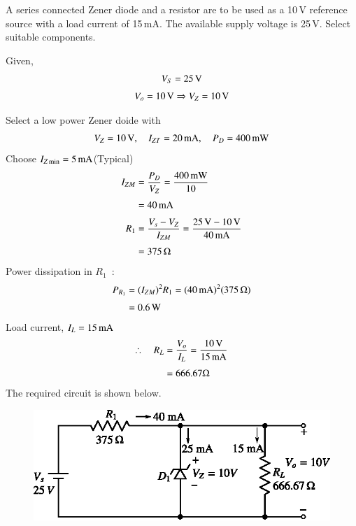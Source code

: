 \begin{example}\label{exam2.29}
A series connected Zener diode and a resistor are to be used as a 10\,V reference source with a load current of 15\,mA. The available supply voltage is 25\,V. Select suitable components.
\end{example}

\begin{solution}
Given,
\begin{gather*}
V_{S} = 25\,\text{V}\\[3pt]
V_{o}=10\text{\,V}\Rightarrow V_{Z}=10\text{\,V}
\end{gather*}

Select a low power Zener doide with
$$
V_{Z}=10\text{\,V},\quad I_{ZT}=20\text{\,mA},\quad P_{D}=400\text{\,mW}
$$
Choose $I_{Z\min}=5\text{\,mA}$\quad (Typical)
\begin{align*}
I_{ZM} &= \frac{P_{D}}{V_{Z}}=\frac{400\text{\,mW}}{10}\\[3pt]
&= 40\text{\,mA}\\[3pt]
R_{1} &= \frac{V_{s}-V_{Z}}{I_{ZM}}=\frac{25\text{\,V}-10\text{\,V}}{40\text{\,mA}}\\[3pt]
&= 375\,\Omega
\end{align*}
Power dissipation in $R_{1}$~:
\begin{align*}
P_{R_{1}} &= (I_{ZM})^{2}R_{1}=(40\text{\,mA})^{2}(375\,\Omega)\\[3pt]
&= 0.6\text{\,W}
\end{align*}
Load current, $I_{L}=15\text{\,mA}$
\begin{align*}
\therefore\quad R_{L} &= \frac{V_{o}}{I_{L}}=\frac{10\text{\,V}}{15\text{\,mA}}\\[3pt]
&= 666.67\Omega
\end{align*}
The required circuit is shown below.
\begin{figure}[H]
\centering
\includegraphics{chap2/sol2.27a.eps}
\end{figure}
\vskip -1cm
\end{solution}

